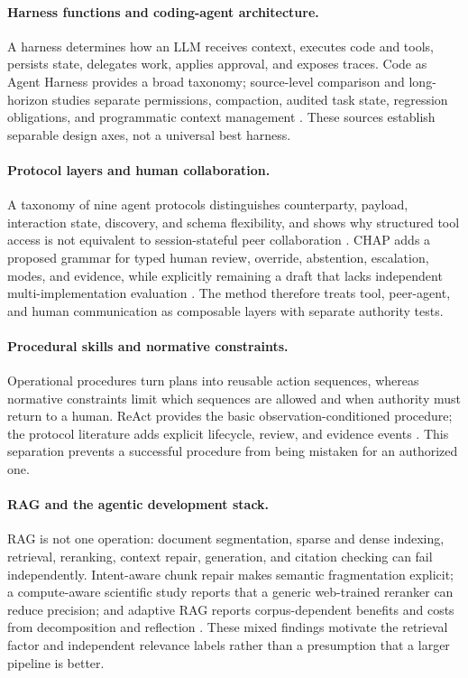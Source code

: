 \documentclass[11pt,a4paper]{article}
\begin{document}
\paragraph{Harness functions and coding-agent architecture.}
A harness determines how an LLM receives context, executes code and tools,
persists state, delegates work, applies approval, and exposes traces.  Code as
Agent Harness provides a broad taxonomy; source-level comparison and
long-horizon studies separate permissions, compaction, audited task state,
regression obligations, and programmatic context management
\citep{codeharness2026,dive2026,longhorizon2026,loopsbench2026,scroll2026}.
These sources establish separable design axes, not a universal best harness.

\paragraph{Protocol layers and human collaboration.}
A taxonomy of nine agent protocols distinguishes counterparty, payload,
interaction state, discovery, and schema flexibility, and shows why structured
tool access is not equivalent to session-stateful peer collaboration
\citep{protocoltaxonomy2026}.  CHAP adds a proposed grammar for typed human
review, override, abstention, escalation, modes, and evidence, while explicitly
remaining a draft that lacks independent multi-implementation evaluation
\citep{chap2026}.  The method therefore treats tool, peer-agent, and human
communication as composable layers with separate authority tests.

\paragraph{Procedural skills and normative constraints.}
Operational procedures turn plans into reusable action sequences, whereas
normative constraints limit which sequences are allowed and when authority must
return to a human.  ReAct provides the basic observation-conditioned procedure;
the protocol literature adds explicit lifecycle, review, and evidence events
\citep{react2023,protocoltaxonomy2026,chap2026}.  This separation prevents a
successful procedure from being mistaken for an authorized one.

\paragraph{RAG and the agentic development stack.}
RAG is not one operation: document segmentation, sparse and dense indexing,
retrieval, reranking, context repair, generation, and citation checking can fail
independently.  Intent-aware chunk repair makes semantic fragmentation explicit;
a compute-aware scientific study reports that a generic web-trained reranker can
reduce precision; and adaptive RAG reports corpus-dependent benefits and costs
from decomposition and reflection
\citep{insemrag2026,sciret2026,adaptiverag2026}.  These mixed findings motivate
the retrieval factor and independent relevance labels rather than a presumption
that a larger pipeline is better.
\end{document}
